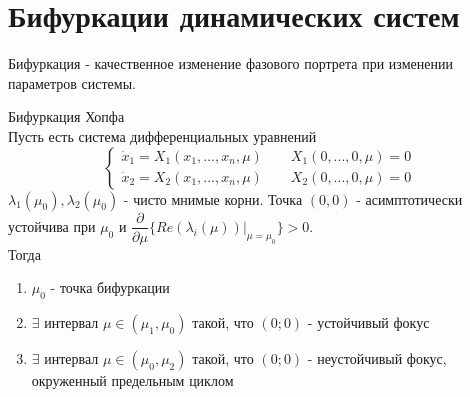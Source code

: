 %
%
%
%
%
% 
\section{Бифуркации динамических систем}
\begin{definition}
Бифуркация - качественное изменение фазового портрета при изменении параметров системы.
\end{definition}
\begin{theorem}{Бифуркация Хопфа}\\
  Пусть есть система дифференциальных уравнений
  \begin{equation}
    \begin{cases}
      \dot{x}_1=X_1(x_1,...,x_n,\mu) \qquad X_1(0,...,0,\mu)=0\\
      \dot{x}_2=X_2(x_1,...,x_n,\mu) \qquad X_2(0,...,0,\mu)=0
    \end{cases}
  \end{equation}
$\lambda_1(\mu_0),\lambda_2(\mu_0)$ - чисто мнимые корни. Точка $(0,0)$ - асимптотически устойчива при $\mu_0$ и
$\dfrac{\partial}{\partial \mu}\{Re(\lambda_i(\mu))|_{\mu=\mu_0}\}>0$.\\
Тогда \begin{enumerate}
  \item $\mu_0$ - точка бифуркации
  \item $\exists$ интервал $\mu\in(\mu_1,\mu_0)$ такой, что $(0;0)$ - устойчивый фокус
  \item $\exists$ интервал $\mu\in(\mu_0,\mu_2)$ такой, что $(0;0)$ - неустойчивый фокус, окруженный предельным циклом
\end{enumerate}
\end{theorem}

